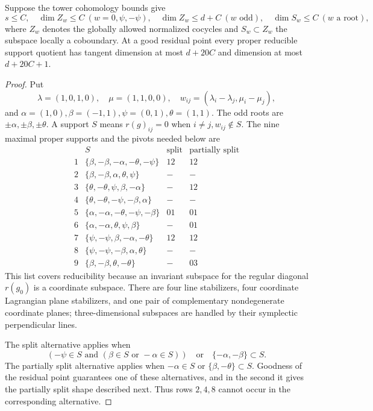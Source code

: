 \begin{srlemma}
\label{lem:sr-four-reducible-tangent}
Suppose the tower cohomology bounds give
\[
 s\le C,\quad \dim Z_w\le C\ (w=0,\psi,-\psi),\quad
 \dim Z_w\le d+C\ (w\text{ odd}),\quad
 \dim S_w\le C\ (w\text{ a root}),
\]
where \(Z_w\) denotes the globally allowed normalized cocycles
and \(S_w\subset Z_w\) the subspace locally a coboundary.
At a good residual point every proper reducible support quotient
has tangent dimension at most \(d+20C\) and dimension at most
\(d+20C+1\).
\end{srlemma}
\begin{proof}
Put
\[
 \lambda=(1,0,1,0),\quad\mu=(1,1,0,0),\quad
 w_{ij}=(\lambda_i-\lambda_j,\mu_i-\mu_j),
\]
and \(\alpha=(1,0),\beta=(-1,1),\psi=(0,1),\theta=(1,1)\).
The odd roots are \(\pm\alpha,\pm\beta,\pm\theta\).
A support \(S\) means \(r(g)_{ij}=0\) when
\(i\ne j,w_{ij}\notin S\).
The nine maximal proper supports and the pivots needed below are
\[
\begin{array}{c|l|c|c}
&S&\text{split}&\text{partially split}\\\hline
1&\{\beta,-\beta,-\alpha,-\theta,-\psi\}&12&12\\
2&\{\beta,-\beta,\alpha,\theta,\psi\}&-&-\\
3&\{\theta,-\theta,\psi,\beta,-\alpha\}&-&12\\
4&\{\theta,-\theta,-\psi,-\beta,\alpha\}&-&-\\
5&\{\alpha,-\alpha,-\theta,-\psi,-\beta\}&01&01\\
6&\{\alpha,-\alpha,\theta,\psi,\beta\}&-&01\\
7&\{\psi,-\psi,\beta,-\alpha,-\theta\}&12&12\\
8&\{\psi,-\psi,-\beta,\alpha,\theta\}&-&-\\
9&\{\beta,-\beta,\theta,-\theta\}&-&03
\end{array}
\]
This list covers reducibility because an invariant subspace for
the regular diagonal \(r(g_0)\) is a coordinate subspace.
There are four line stabilizers, four coordinate Lagrangian
plane stabilizers, and one pair of complementary nondegenerate
coordinate planes; three-dimensional subspaces are handled by
their symplectic perpendicular lines.

The split alternative applies when
\[
 (-\psi\in S\text{ and }(\beta\in S\text{ or }-\alpha\in S))
 \quad\text{or}\quad\{-\alpha,-\beta\}\subset S.
\]
The partially split alternative applies when
\(-\alpha\in S\) or \(\{\beta,-\theta\}\subset S\).
Goodness of the residual point guarantees one of these
alternatives, and in the second it gives the partially split
shape described next. Thus rows \(2,4,8\) cannot occur in the
corresponding alternative.


\end{proof}
